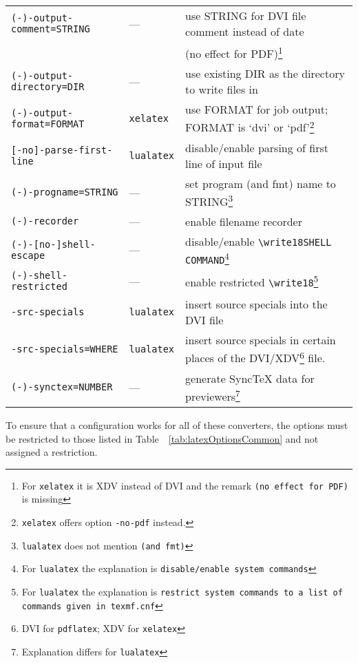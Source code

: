 \documentclass{article}
\newcommand{\pdflatex}{\texttt{pdflatex}}
\newcommand{\lualatex}{\texttt{lualatex}}
\newcommand{\xelatex}{\texttt{xelatex}}
\begin{document}
{\begin{longtable}{|lll|}
\texttt{(-)-output-comment=STRING} & ---         & use STRING for DVI file comment instead of date \\
                                   &             & (no effect for PDF)\footnote%
{For \xelatex{} it is XDV instead of DVI and the remark \texttt{(no effect for PDF)} is missing} \\
\texttt{(-)-output-directory=DIR}  & ---         & use existing DIR as the directory to write files in \\
\texttt{(-)-output-format=FORMAT}     & \xelatex{}  & use FORMAT for job output; FORMAT is `dvi' or `pdf'\footnote%
{\xelatex{} offers option \texttt{-no-pdf} instead. } \\
\texttt{[-no]-parse-first-line}    & \lualatex{} & disable/enable parsing of first line of input file \\
\texttt{(-)-progname=STRING}       & ---         & set program (and fmt) name to STRING\footnote%
{\lualatex{} does not mention \texttt{(and fmt)}} \\
\texttt{(-)-recorder}              & ---         & enable filename recorder \\
\texttt{(-)-[no-]shell-escape}     & ---         & disable/enable \texttt{\textbackslash{}write18{SHELL COMMAND}}\footnote%
{For \lualatex{} the explanation is \texttt{disable/enable system commands}} \\
\texttt{(-)-shell-restricted}      & ---         & enable restricted \texttt{\textbackslash{}write18}\footnote%
{For \lualatex{} the explanation is \texttt{restrict system commands to a list of commands given in texmf.cnf}} \\
\texttt{-src-specials}             & \lualatex{} & insert source specials into the DVI file \\
\texttt{-src-specials=WHERE}       & \lualatex{} & insert source specials in certain places of
                          the DVI/XDV\footnote{DVI for \pdflatex; XDV for \xelatex} file. \\
\texttt{(-)-synctex=NUMBER}        & ---         & generate SyncTeX data for previewers\footnote%
{Explanation differs for \lualatex} \\ 
                        

           
\end{longtable}
} %


To ensure that a configuration works for all of these converters, 
the options must be restricted to those listed in Table~~\ref{tab:latexOptionsCommon} 
and not assigned a restriction. 
\end{document}
